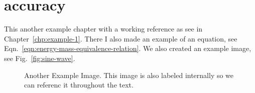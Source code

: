 \documentclass[\main/master.tex]{subfiles}
\begin{document}
 


\color{blue}


\color{black}



\section{accuracy}
\doublespacing
\hspace{5 mm} This another example chapter with a working reference as see in Chapter~\ref{chp:example-1}. There I also made an example of an equation, see Eqn.~\ref{eqn:energy-mass-equivalence-relation}. We also created an example image, see Fig.~\ref{fig:sine-wave}.
\begin{figure}[htbp]
	\centering
	\caption[Another Example Image]{Another Example Image. This image is also labeled internally so we can referenc it throughout the text.}
	\label{fig:cosine-wave}
\end{figure}
\end{document}
